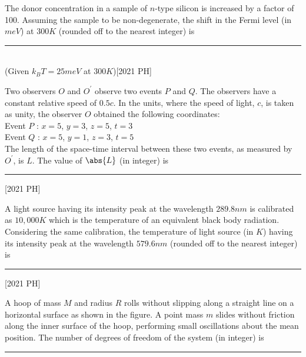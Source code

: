 \iffalse
\title{2021-PH-27-39}
\author{EE24BTECH11010 - BALAJI B}
\section{ph}
\chapter{2021}
\fi
    \item The donor concentration in a sample of $n$-type silicon is increased by a factor
of 100. Assuming the sample to be non-degenerate, the shift in the Fermi
level (in $meV$) at $300 K$ (rounded off to the nearest integer) is \rule{2cm}{0.4pt}\\ (Given $k_BT = 25 meV$ at $300K$)\hfill [2021 PH]
\item Two observers $O$ and $O^\prime$ observe two events $P$ and $Q$. The observers have a
constant relative speed of $0.5c$. In the units, where the speed of light, $c$, is
taken as unity, the observer $O$ obtained the following coordinates: \\
Event $P$ : $x = 5$, $y = 3$, $z = 5$, $t = 3$ \\
Event $Q$ : $x = 5$, $y = 1$, $z = 3$, $t = 5$\\
The length of the space-time interval between these two events, as measured by $O^\prime$, is $L$. The value of $\abs{L}$ (in integer) is \rule{2cm}{0.4pt}\hfill [2021 PH]
\item A light source having its intensity peak at the wavelength $289.8 nm$ is
calibrated as $10,000 K$ which is the temperature of an equivalent black body
radiation. Considering the same calibration, the temperature of light source
(in $K$) having its intensity peak at the wavelength $579.6 nm$ (rounded off to
the nearest integer) is \rule{2cm}{0.4pt}

\hfill [2021 PH]
\item A hoop of mass $M$ and radius $R$ rolls without slipping along a straight line
on a horizontal surface as shown in the figure. A point mass $m$ slides without
friction along the inner surface of the hoop, performing small oscillations
about the mean position. The number of degrees of freedom of the system
(in integer) is \rule{1.5cm}{0.4pt}


